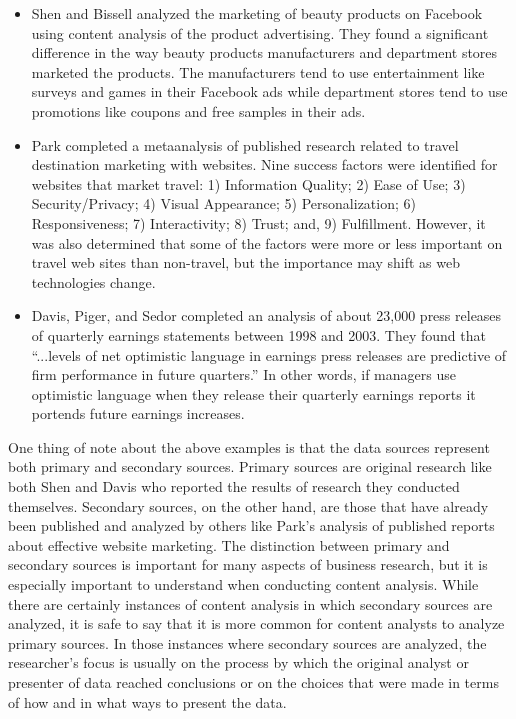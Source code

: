 \begin{itemize}
	\item Shen and Bissell\cite{shen2013social} analyzed the marketing of beauty products on Facebook using content analysis of the product advertising. They found a significant difference in the way beauty products manufacturers and department stores marketed the products. The manufacturers tend to use entertainment like surveys and games in their Facebook ads while department stores tend to use promotions like coupons and free samples in their ads.
	\item Park\cite{park2007success} completed a \gls{metaanalysis} of published research related to travel destination marketing with websites. Nine success factors were identified for websites that market travel: 1) Information Quality; 2) Ease of Use; 3) Security/Privacy; 4) Visual Appearance; 5) Personalization; 6) Responsiveness; 7) Interactivity; 8) Trust; and, 9) Fulfillment. However, it was also determined that some of the factors were more or less important on travel web sites than non-travel, but the importance may shift as web technologies change.
	\item Davis, Piger, and Sedor\cite{davis2012beyond} completed an analysis of about 23,000 press releases of quarterly earnings statements between 1998 and 2003. They found that ``...levels of net optimistic language in earnings press releases are predictive of firm performance in future quarters.'' In other words, if managers use optimistic language when they release their quarterly earnings reports it portends future earnings increases.
\end{itemize} 

One thing of note about the above examples is that the data sources represent both primary and secondary sources. Primary sources are original research like both Shen and Davis who reported the results of research they conducted themselves. Secondary sources, on the other hand, are those that have already been published and analyzed by others like Park's analysis of published reports about effective website marketing. The distinction between primary and secondary sources is important for many aspects of business research, but it is especially important to understand when conducting content analysis. While there are certainly instances of content analysis in which secondary sources are analyzed, it is safe to say that it is more common for content analysts to analyze primary sources. In those instances where secondary sources are analyzed, the researcher's focus is usually on the process by which the original analyst or presenter of data reached conclusions or on the choices that were made in terms of how and in what ways to present the data.

